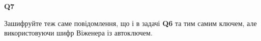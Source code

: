 \documentclass{../../test-template}
\begin{document}
\begin{tcolorbox}[lowerbox=invisible,colback=white]
    \begin{minipage}{0.1\textwidth}
        \raggedright
        \vspace*{\fill}
            \textbf{Q7}
        \vspace*{\fill}
        \end{minipage}
        \begin{minipage}{0.75\textwidth}
Зашифруйте теж саме повідомлення, що і в задачі \textbf{Q6} та тим самим ключем, але використовуючи шифр Віженера із автоключем.
        \end{minipage}
\end{tcolorbox}
\end{document}
